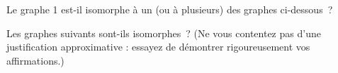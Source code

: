 \begin{exo}
Le graphe 1 est-il isomorphe \`a un (ou \`a plusieurs) des graphes ci-dessous~?
\end{exo}

\begin{figure}[!h]
\centering
\scalebox{.825}{}
\caption{}
\end{figure}

\begin{figure}[!h]
\centering
\scalebox{.825}{}
\caption{}
\end{figure}

\newpage
\begin{exo}
Les graphes suivants sont-ils isomorphes~? (Ne vous contentez pas d'une justification approximative : essayez de d\'emontrer rigoureusement vos affirmations.)
\end{exo}

\begin{figure}[!h]
\centering

\caption{}
\end{figure}%

\begin{figure}[!h]
\centering

\caption{}
\end{figure}

\begin{figure}[!h]
\centering

\caption{}
\end{figure}
